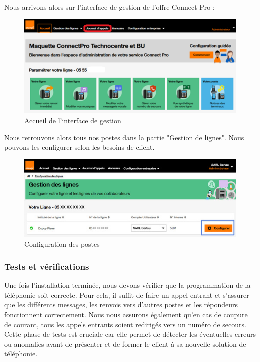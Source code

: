 \documentclass[12pt, a4paper]{article}
\begin{document}
Nous arrivons alors sur l'interface de gestion
de l'offre Connect Pro : 
\begin{figure}[h]
	\centering
	\includegraphics[scale=1.3]{img/accueil.png}
	\caption{Accueil de l'interface de gestion}
\end{figure}

Nous retrouvons alors tous nos postes 
dans la partie "Gestion de lignes". Nous pouvons
les configurer selon les besoins de client. 

\begin{figure}[h]
	\centering
	\includegraphics[scale=0.65]{img/configuration.jpg}
	\caption{Configuration des postes}
\end{figure}

\newpage
\subsubsection{Tests et vérifications}
Une fois l'installation terminée, nous devons
vérifier que la programmation de la téléphonie 
soit correcte. Pour cela, il suffit de faire 
un appel entrant et s'assurer que les différents
messages, les renvois vers d'autres postes et
les répondeurs fonctionnent correctement. 
Nous nous assurons également qu'en cas 
de coupure de courant, tous les appels entrants
soient redirigés vers un numéro de secours.\\

Cette phase de tests est cruciale car elle permet 
de détecter les éventuelles erreurs ou anomalies
avant de présenter et de former le client 
à sa nouvelle solution de téléphonie.\\
\end{document}
